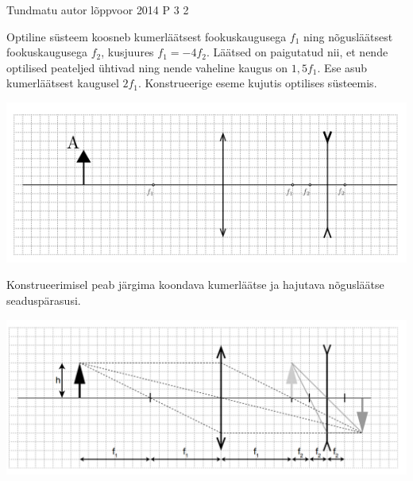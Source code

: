 {Tundmatu autor} %
{lõppvoor} %
{2014} %
{P 3} %
{2} %
{
\ifStatement
Optiline süsteem koosneb kumerläätsest fookuskaugusega $f_1$ ning nõgusläätsest fookuskaugusega $f_2$, kusjuures $f_1 = -4f_2$. Läätsed on paigutatud nii, et nende optilised peateljed ühtivad ning nende vaheline kaugus on $1,5f_1$. Ese asub kumerläätsest kaugusel $2f_1$. Konstrueerige eseme kujutis optilises süsteemis. 
\begin{center}
	\includegraphics[width=0.5\linewidth]{2014-v3p-03-yl.PNG}
\end{center}
\fi
\ifHint
Konstrueerimisel peab järgima koondava kumerläätse ja hajutava nõgusläätse seaduspärasusi.
\fi
\ifSolution
\begin{center}
	\includegraphics[width=0.5\linewidth]{2014-v3p-03-lah.PNG}
\end{center}
\fi
}
 
